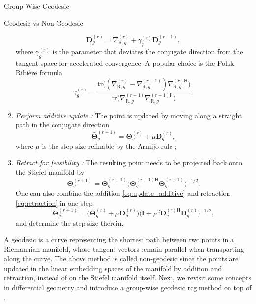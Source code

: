 \documentclass[journal]{IEEEtran}
\begin{document}
\begin{section}{Group-Wise Geodesic }
\begin{subsection}{Geodesic vs Non-Geodesic }
\begin{enumerate}
			\begin{equation}
				\mathbf{D}_g^{(r)} = \nabla_{\mathrm{R},g}^{(r)} + \gamma_g^{(r)} \mathbf{D}_g^{(r-1)}, %
				\label{eq:direction_cg}
			\end{equation}
			where $\gamma_g^{(r)}$ is the parameter that deviates the conjugate direction from the tangent space for accelerated convergence. A popular choice is the Polak-Ribi\`{e}re formula
			\begin{equation}
				\gamma_g^{(r)} = \frac{\mathrm{tr}\bigl((\nabla_{\mathrm{R},g}^{(r)} - \nabla_{\mathrm{R},g}^{(r-1)}) {\nabla_{\mathrm{R},g}^{(r)\mathsf{H}}}\bigr)}{\mathrm{tr}\bigl(\nabla_{\mathrm{R},g}^{(r-1)} {\nabla_{\mathrm{R},g}^{(r-1)\mathsf{H}}}\bigr)}; %
				\label{eq:parameter_cg}
			\end{equation}
			\item \emph{Perform additive update \cite{Pan2022d}:} The point is updated by moving along a straight path in the conjugate direction
			\begin{equation}
				\bar{\mathbf{\Theta}}_g^{(r+1)} = \mathbf{\Theta}_g^{(r)} + \mu \mathbf{D}_g^{(r)},
				\label{eq:update_additive}
			\end{equation}
			where $\mu$ is the step size refinable by the Armijo rule \cite{Armijo1966};
			\item \emph{Retract for feasibility \cite{Absil2009,Li2023b}:} The resulting point needs to be projected back onto the Stiefel manifold by
			\begin{equation}
				\mathbf{\Theta}_g^{(r+1)} = \bar{\mathbf{\Theta}}_g^{(r+1)} \bigl({\bar{\mathbf{\Theta}}_g^{(r+1)\mathsf{H}}} \bar{\mathbf{\Theta}}_g^{(r+1)}\bigr)^{-1/2}.
				\label{eq:retraction}
			\end{equation}
			One can also combine the addition \eqref{eq:update_additive} and retraction \eqref{eq:retraction} in one step
			\begin{equation}
				\mathbf{\Theta}_g^{(r+1)} = \bigl(\mathbf{\Theta}_g^{(r)} + \mu \mathbf{D}_g^{(r)}\bigr) \bigl( \mathbf{I} + \mu^2 {\mathbf{D}_g^{(r)\mathsf{H}}} \mathbf{D}_g^{(r)} \bigr)^{-1/2},
				\label{eq:add_then_retract}
			\end{equation}
			and determine the step size therein.
		\end{enumerate}

		A geodesic is a curve representing the shortest path between two points in a Riemannian manifold, whose tangent vectors remain parallel when transporting along the curve.
		The above method is called non-geodesic since the points are updated in the linear embedding spaces of the manifold by addition and retraction, instead of on the Stiefel manifold itself.
		Next, we revisit some concepts in differential geometry and introduce a group-wise geodesic \gls{rcg} method on top of \cite{Abrudan2008,Abrudan2009}.


\end{subsection}
\end{section}
\end{document}
